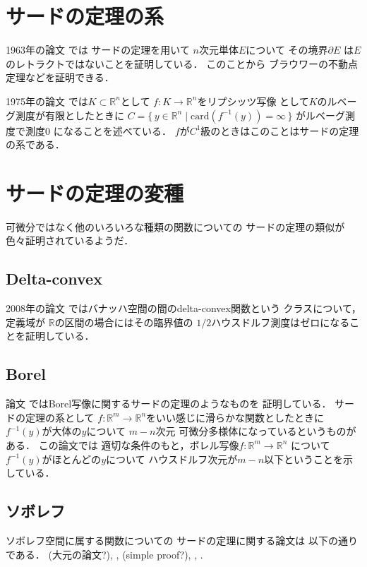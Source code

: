 \documentclass[leqno, a4paper, 12pt]{jsarticle}
\newcommand{\rr}{\mathbb{R}}
\newcommand{\card}{\mathrm{card}}
\begin{document}
\section{サードの定理の系}

1963年の論文
\cite{MR0145502}
では
サードの定理を用いて
$n$次元単体$E$について
その境界$\partial E$
は$E$のレトラクトではないことを証明している．
このことから
ブラウワーの不動点定理などを証明できる．

1975年の論文
\cite{MR0364578}
では$K\subset \rr^{n}$として
$f\colon K\to \rr^{n}$をリプシッツ写像
として$K$のルベーグ測度が有限としたときに
$C=\{\, y\in \rr^{n}\mid \card(f^{-1}(y))=\infty\, \}$
がルベーグ測度で測度$0$
になることを述べている．
$f$が$C^{1}$級のときはこのことはサードの定理の系である．

\section{サードの定理の変種}
可微分ではなく他のいろいろな種類の関数についての
サードの定理の類似が色々証明されているようだ．

\subsection{Delta-convex}
2008年の論文
\cite{MR2472482}
ではバナッハ空間の間のdelta-convex関数という
クラスについて，
定義域が
$\rr$の区間の場合にはその臨界値の
$1/2$ハウスドルフ測度はゼロになることを証明している．


\subsection{Borel}
論文\cite{MR1305213}
ではBorel写像に関するサードの定理のようなものを
証明している．
サードの定理の系として
$f\colon \rr^{m}\to \rr^{n}$をいい感じに滑らかな関数としたときに
$f^{-1}(y)$が大体の$y$について
$m-n$次元
可微分多様体になっているというものがある．
この論文では
適切な条件のもと，ボレル写像$f\colon \rr^{m}\to \rr^{n}$
について$f^{-1}(y)$がほとんどの$y$について
ハウスドルフ次元が$m-n$以下ということを示している．


\subsection{ソボレフ}

ソボレフ空間に属する関数についての
サードの定理に関する論文は
以下の通りである．
\cite{MR1871360}(大元の論文?), 
\cite{MR2183045},
\cite{MR2415054}(simple proof?), 
\cite{MR2923414}, 
\cite{MR3318511}. 
\end{document}
